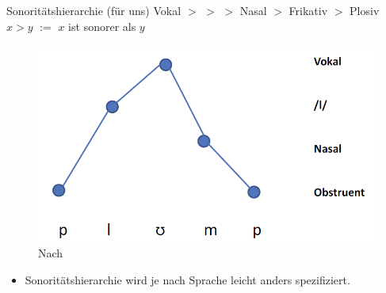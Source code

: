 \begin{frame}

\begin{block}{Sonoritätshierarchie (für uns)}
Vokal $>$ \textipa{/\textscr /} $>$  $>$ Nasal $>$ Frikativ $>$ Plosiv \\
$x > y$ $:=$ $x$ ist sonorer als $y$
\end{block}


\begin{figure}
\centering
\includegraphics[scale=.3]{material/03bSonoritaetBsp}
\caption{Nach \citet[225]{Hall00a}}
\end{figure}

\begin{itemize}
	\item Sonoritätshierarchie wird je nach Sprache leicht anders spezifiziert.
\end{itemize}
\end{frame}


